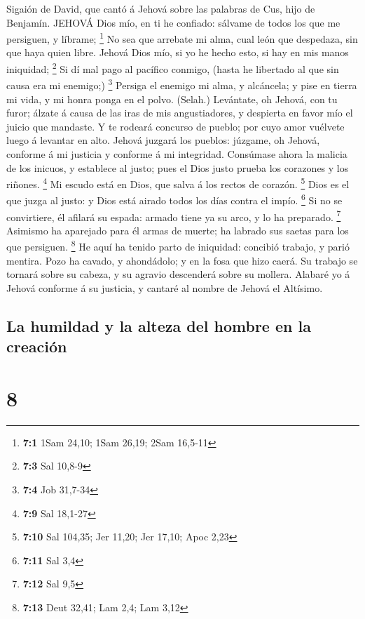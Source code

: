  Sigaión de David, que cantó á Jehová sobre las palabras de
Cus, hijo de Benjamín. JEHOVÁ Dios mío, en ti he confiado: sálvame de
todos los que me persiguen, y líbrame; \footnote{\textbf{7:1} 1Sam
  24,10; 1Sam 26,19; 2Sam 16,5-11}  No sea que arrebate mi
alma, cual león que despedaza, sin que haya quien libre. 
Jehová Dios mío, si yo he hecho esto, si hay en mis manos iniquidad;
\footnote{\textbf{7:3} Sal 10,8-9}  Si dí mal pago al
pacífico conmigo, (hasta he libertado al que sin causa era mi enemigo;)
\footnote{\textbf{7:4} Job 31,7-34}  Persiga el enemigo mi
alma, y alcáncela; y pise en tierra mi vida, y mi honra ponga en el
polvo. (Selah.)  Levántate, oh Jehová, con tu furor; álzate
á causa de las iras de mis angustiadores, y despierta en favor mío el
juicio que mandaste.  Y te rodeará concurso de pueblo; por
cuyo amor vuélvete luego á levantar en alto.  Jehová juzgará
los pueblos: júzgame, oh Jehová, conforme á mi justicia y conforme á mi
integridad.  Consúmase ahora la malicia de los inicuos, y
establece al justo; pues el Dios justo prueba los corazones y los
riñones. \footnote{\textbf{7:9} Sal 18,1-27}  Mi escudo
está en Dios, que salva á los rectos de corazón. \footnote{\textbf{7:10}
  Sal 104,35; Jer 11,20; Jer 17,10; Apoc 2,23}  Dios es el
que juzga al justo: y Dios está airado todos los días contra el impío.
\footnote{\textbf{7:11} Sal 3,4}  Si no se convirtiere, él
afilará su espada: armado tiene ya su arco, y lo ha preparado.
\footnote{\textbf{7:12} Sal 9,5}  Asimismo ha aparejado
para él armas de muerte; ha labrado sus saetas para los que persiguen.
\footnote{\textbf{7:13} Deut 32,41; Lam 2,4; Lam 3,12}  He
aquí ha tenido parto de iniquidad: concibió trabajo, y parió mentira.
 Pozo ha cavado, y ahondádolo; y en la fosa que hizo caerá.
 Su trabajo se tornará sobre su cabeza, y su agravio
descenderá sobre su mollera.  Alabaré yo á Jehová conforme
á su justicia, y cantaré al nombre de Jehová el Altísimo.

\hypertarget{la-humildad-y-la-alteza-del-hombre-en-la-creaciuxf3n}{%
\subsection{La humildad y la alteza del hombre en la
creación}\label{la-humildad-y-la-alteza-del-hombre-en-la-creaciuxf3n}}

\hypertarget{section-7}{%
\section{8}\label{section-7}}

